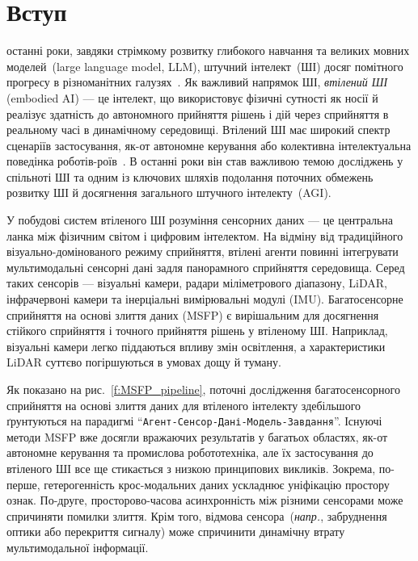 \section{Вступ}
\label{s:introduction}


 останні роки, завдяки стрімкому розвитку глибокого навчання та великих мовних моделей~(large language model, LLM), штучний інтелект~(ШІ) досяг помітного прогресу в різноманітних галузях~\cite{ruan2021dae,ruan2025cpws,ruan2024color}.
Як важливий напрямок ШІ, \emph{втілений ШІ} (embodied AI) — це інтелект, що використовує фізичні сутності як носії й реалізує здатність до автономного прийняття рішень і дій через сприйняття в реальному часі в динамічному середовищі.
Втілений ШІ має широкий спектр сценаріїв застосування, як-от автономне керування або колективна інтелектуальна поведінка роботів-роїв~\cite{ren2024embodied,gupta2021embodied}. В останні роки він став важливою темою досліджень у спільноті ШІ
та одним із ключових шляхів подолання поточних обмежень розвитку ШІ й досягнення загального штучного інтелекту~(AGI).

У побудові систем втіленого ШІ розуміння сенсорних даних — це центральна ланка між фізичним світом і цифровим інтелектом. На відміну від традиційного візуально-домінованого режиму сприйняття, втілені агенти повинні інтегрувати мультимодальні сенсорні дані задля панорамного сприйняття середовища. Серед таких сенсорів — візуальні камери, радари міліметрового діапазону, LiDAR, інфрачервоні камери та інерціальні вимірювальні модулі (IMU).
Багатосенсорне сприйняття на основі злиття даних (MSFP) є вирішальним для досягнення стійкого сприйняття і точного прийняття рішень у втіленому ШІ. Наприклад, візуальні камери легко піддаються впливу змін освітлення, а характеристики LiDAR суттєво погіршуються в умовах дощу й туману.

Як показано на рис.~\ref{f:MSFP_pipeline}, поточні дослідження багатосенсорного сприйняття на основі злиття даних для втіленого інтелекту здебільшого ґрунтуються на парадигмі ``\texttt{Агент-Сенсор-Дані-Модель-Завдання}''.
Існуючі методи MSFP вже досягли вражаючих результатів у багатьох областях, як-от автономне керування та промислова робототехніка, але їх застосування до втіленого ШІ все ще стикається з низкою принципових викликів. Зокрема, по-перше, гетерогенність крос-модальних даних ускладнює уніфікацію простору ознак.
По-друге, просторово-часова асинхронність між різними сенсорами може спричиняти помилки злиття.
Крім того, відмова сенсора~(\textit{напр.}, забруднення оптики або перекриття сигналу) може спричинити динамічну втрату мультимодальної інформації.


